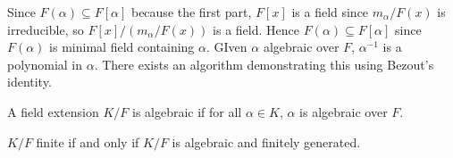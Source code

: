     Since $F(\alpha)\subseteq{F}[\alpha]$ because the first part,
    $F[x]$ is a field since $m_{\alpha}/F(x)$ is irreducible, so
    $F[x]/(m_{\alpha}/F(x))$ is a field. Hence
    $F(\alpha)\subseteq{F}[\alpha]$ since $F(\alpha)$ is minimal field
    containing $\alpha$. GIven $\alpha$ algebraic over $F$,
    $\alpha^{\minus{1}}$ is a polynomial in $\alpha$. There exists an
    algorithm demonstrating this using Bezout's identity.
    \begin{definition}
        A field extension $K/F$ is algebraic if for all $\alpha\in{K}$,
        $\alpha$ is algebraic over $F$.
    \end{definition}
    \begin{theorem}
        $K/F$ finite if and only if $K/F$ is algebraic and finitely
        generated.
    \end{theorem}
